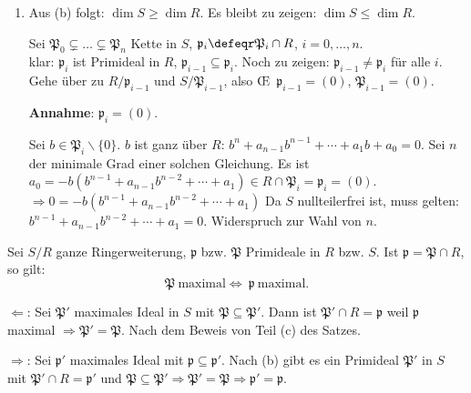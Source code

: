 \begin{Bew}
\begin{enumerate}
\item Aus (b) folgt: $\dim{S} \geq\dim{R}$. Es bleibt zu
zeigen: $\dim{S} \leq \dim{R}$.

Sei $\mathfrak{P}_0\subsetneq \ldots \subsetneq \mathfrak{P}_n$ Kette in $S$, 
$\mathfrak{p}_i\defeqr \mathfrak{P}_i\cap R$, $i=0,\ldots,n$.\\
klar: $\mathfrak{p}_i$ ist Primideal in $R$, $\mathfrak{p}_{i-1}\subseteq \mathfrak{p}_i$.
Noch zu zeigen: $\mathfrak{p}_{i-1}\neq \mathfrak{p}_i$ f\"ur alle $i$. Gehe \"uber zu
$R/\mathfrak{p}_{i-1}$ und $S/\mathfrak{P}_{i-1}$, also \OE\ $\mathfrak{p}_{i-1}=(0)$,
$\mathfrak{P}_{i-1}=(0)$.

\textbf{Annahme}: $\mathfrak{p}_i=(0)$.

Sei $b\in \mathfrak{P}_{i}\backslash \{0\}$. $b$ ist ganz \"uber $R$: $b^n+a_{n-1}b^{n-1}+\cdots+a_1b+a_0=0$. Sei $n$ der minimale Grad einer solchen Gleichung.
Es ist $a_0=-b(b^{n-1}+a_{n-1}b^{n-2}+\cdots+a_1)\in R\cap \mathfrak{P}_i=\mathfrak{p}_i=(0)$.
$\Rightarrow 0=-b(b^{n-1}+a_{n-1}b^{n-2}+\cdots+a_1)$
Da $S$ nullteilerfrei ist, muss gelten: $b^{n-1}+a_{n-1}b^{n-2}+\cdots+a_1=0$. Widerspruch zur
Wahl von $n$.

\end{enumerate}
\end{Bew}

\begin{Folg}
\label{2.26}
Sei $S/R$ ganze Ringerweiterung, $\mathfrak{p}$ bzw. $\mathfrak{P}$ Primideale in $R$ bzw. $S$.
Ist $\mathfrak{p}=\mathfrak{P}\cap R$, so gilt:
\[
\mathfrak{P}\ \text{maximal} \Leftrightarrow\ \mathfrak{p}\ \text{maximal}.
\]
\end{Folg}

\begin{Bew}
\glqq$\Leftarrow$\grqq: Sei $\mathfrak{P}'$ maximales Ideal in $S$ mit 
$\mathfrak{P}\subseteq \mathfrak P'$. Dann ist $\mathfrak{P}'\cap R=\mathfrak{p}$ weil
$\mathfrak{p}$ maximal $\Rightarrow\mathfrak{P'}=\mathfrak{P}$. Nach dem Beweis
von Teil (c) des Satzes.

\glqq$\Rightarrow$\grqq: Sei $\mathfrak{p}'$ maximales Ideal mit $\mathfrak{p}\subseteq \mathfrak{p'}$.
Nach (b) gibt es ein Primideal $\mathfrak{P}'$ in $S$ mit $\mathfrak{P}'\cap R=\mathfrak{p}'$
und $\mathfrak{P}\subseteq \mathfrak{P}'\Rightarrow \mathfrak{P'}=\mathfrak{P}\Rightarrow
\mathfrak{p}'=\mathfrak{p}$.

\end{Bew}

